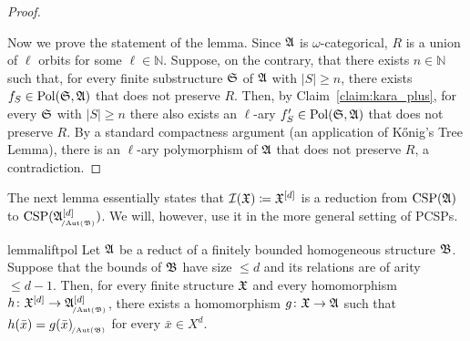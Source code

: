 \begin{proof}
\begin{claimproof}
\end{claimproof}
%
Now we prove the statement of the lemma.
%
    Since $\mathfrak{A}$ is $\omega$-categorical, $R$ is a union of $\ell$ orbits for some $\ell \in \mathbb{N}$.
    Suppose, on the contrary, that there exists $n\in\mathbb{N}$ such that, for every finite substructure $\mathfrak{S}$ of $\mathfrak{A}$ with $|S|\geq n$, there exists $f_S \in \mathrm{Pol}(\mathfrak{S},\mathfrak{A})$ that does not preserve $R$.
    Then, by Claim~\ref{claim:kara_plus}, for every $\mathfrak{S}$ with $|S|\geq n$ there also exists an $\ell $-ary $f'_S\in\mathrm{Pol}(\mathfrak{S},\mathfrak{A})$ that does not preserve $R$. By a standard compactness argument (an application of K\H{o}nig's Tree Lemma), there is an $\ell $-ary polymorphism of $\mathfrak{A}$ that does not preserve $R$, a contradiction.
\end{proof}

The next lemma essentially states that $\mathcal{I}(\mathfrak{X})\mathrel{\mathop:}\mathrel{\mkern-1.2mu}= {\mathfrak{X}}^{[d]}$ is a reduction from $\mathrm{CSP}(\mathfrak{A})$ to $\CSP(\fpwr{\struct{A}}{d}_{\orbeq{\Aut(\struct{B})}})$. 
 We will, however, use it in the more general setting of PCSPs.

 

\begin{restatable}{lemma}{liftpol}\label{lemma:liftpol} 
Let $\mathfrak{A}$ be a reduct of a finitely bounded homogeneous structure $\mathfrak{B}$. 
%
Suppose that the bounds of $\mathfrak{B}$ have size $\leq d$ and its relations
are of arity $\leq d-1$.  
%
Then, for every finite structure $\mathfrak{X}$ and every homomorphism $h\colon \fpwr{\struct{X}}{d}\to\fpwr{\struct{A}}{d}_{\orbeq{\Aut(\struct{B})}}$, there exists a homomorphism $g\colon\mathfrak{X}\to\mathfrak{A}$ such that $h(\bar{x})=g(\bar{x})_{\orbeq{\Aut(\struct{B})}}$ for every $\bar{x}\in X^d$. 
% 
 \end{restatable}  

